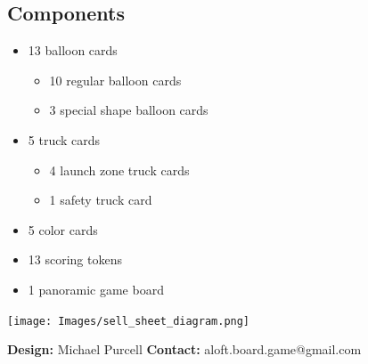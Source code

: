\documentclass[a5paper, DIV=18, 12pt]{scrartcl}
\begin{document}
\begin{multicols}{2}
\section*{\textcolor{SunriseBlue}{Components}}
\begin{itemize}[nosep, leftmargin=*]
	\item 13 balloon cards
	\begin{itemize}[nosep, leftmargin=*]
	  \item 10 regular balloon cards
	  \item 3 special shape balloon cards
	\end{itemize}
	\vspace{0.5ex}
	\item 5 truck cards
	\begin{itemize}[nosep, leftmargin=*]
	  \item 4 launch zone truck cards
	  \item 1 safety truck card
	\end{itemize}
	\vspace{0.5ex}
	\item 5 color cards
	\vspace{0.5ex}
	\item 13 scoring tokens
	\vspace{0.5ex}
	\item 1 panoramic game board
\end{itemize}
\vspace{3.2ex}
\end{multicols}
\begin{center}
\vspace{-1.5ex}
\texttt{[image: Images/sell\_sheet\_diagram.png]}
\end{center}
\textbf{Design:} Michael Purcell \hfill \textbf{Contact:} aloft.board.game@gmail.com
\end{document}
